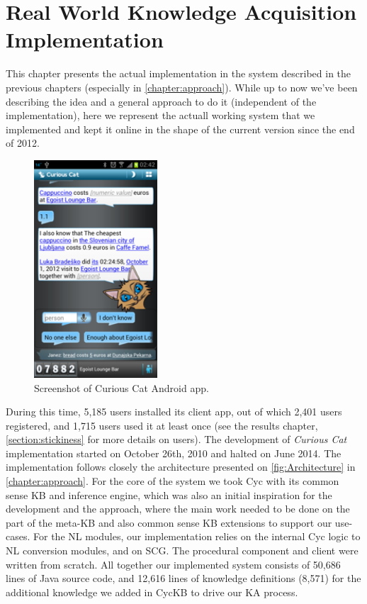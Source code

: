 % 
\chapter{Real World Knowledge Acquisition Implementation}
\label{chapter:implementation}
This chapter presents the actual implementation in the system described
in the previous chapters (especially in \autoref{chapter:approach}). While up 
to now we've been describing the idea and a general approach to do it 
(independent of the implementation), here we represent the actuall working
system that we implemented and kept it online in the shape of the current 
version since the end of 2012. 

\begin{figure}[H]
	\centering
		\includegraphics[width=0.41\textwidth]{figures/androidExample.png}
	\caption{Screenshot of Curious Cat Android app.}
	\label{fig:androidExample}
\end{figure}

During this time, 5,185 users installed its
client app, out of which 2,401 users registered, and 1,715 users used it at 
least once (see the results chapter, \autoref{section:stickiness} for more 
details on users).
The development  of \emph{Curious Cat} implementation started on October 
26th, 2010 and halted on June 2014. The
implementation follows closely the architecture presented on 
\autoref{fig:Architecture} in \autoref{chapter:approach}. For the core
of the system we took Cyc with its common sense KB and inference engine, which 
was also an initial inspiration for the development and the approach, where
the main work needed to be done on the part of the meta-KB and also common
sense KB extensions to support our use-cases. For the NL modules, our 
implementation relies on the internal Cyc logic to NL conversion modules, and
on SCG\parencite{Schneider2015}. The procedural component and client were 
written from scratch. All together our implemented system consists of 50,686
lines of Java source code, and 12,616 lines of knowledge definitions (8,571) for
the additional knowledge we added in CycKB to drive our KA process.

